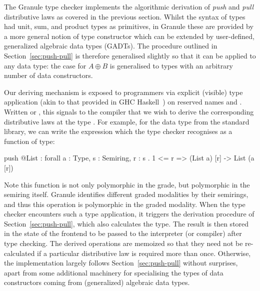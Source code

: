  The Granule type checker implements the algorithmic derivation of \emph{push}
 and \emph{pull} distributive laws as covered in the previous section. Whilst the
 syntax of \grminip{} types had unit, sum, and product types as primitives, in
 Granule these are provided by a more general notion of type constructor which
 can be extended by user-defined, generalized algebraic data types (GADTs). The
 procedure outlined in Section~\ref{sec:push-pull} is therefore generalised
 slightly so that it can be applied to any data type: the case for $A \oplus B$
 is generalised to types with an arbitrary number of data constructors.
 
 Our deriving mechanism is exposed to programmers via explicit (visible) type
 application (akin to that provided in GHC Haskell~\cite{eisenberg2016visible})
 on reserved names  and . Written  or
 , this signals to the compiler that we wish to derive the
 corresponding distributive laws at the type . For example, for the
  data type from the standard library, we can write
 the expression  which the type checker recognises as a
 function of type:

\begin{granule}
push @List : forall {a : Type, s : Semiring, r : s} 
           . {1 <= r} => (List a) [r] -> List (a [r])
\end{granule}
 Note this function is not only polymorphic in the grade, but polymorphic in the
 semiring itself. Granule identifies different graded modalities by
 their semirings, and thus this operation is polymorphic in the graded
 modality. When the type checker encounters such a type application, it
 triggers the derivation procedure of Section~\ref{sec:push-pull},
 which also calculates the type. The result is then stored in the state
 of the frontend to be passed to the interpreter (or compiler) after
 type checking. The derived operations are memoized so that they need not be re-calculated if a particular distributive law is required more than once.
 Otherwise, the implementation largely follows
 Section~\ref{sec:push-pull} without surprises,
 apart from some additional machinery for specialising the types
 of data constructors coming from (generalized) algebraic data types.
 
